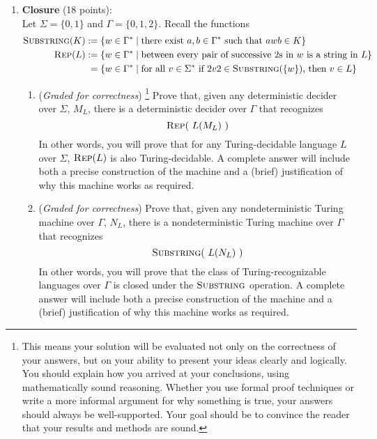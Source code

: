 \documentclass[12pt, oneside]{article}
\newcommand{\gradeCorrect}{({\it Graded for correctness}) }
\newcommand{\gradeCorrectFirst}{\gradeCorrect\footnote{This means your solution 
will be evaluated not only on the correctness of your answers, but on your ability
to present your ideas clearly and logically. You should explain how you 
arrived at your conclusions, using
mathematically sound reasoning. Whether you use formal proof techniques or 
write a more informal argument
for why something is true, your answers should always be well-supported. 
Your goal should be to convince the
reader that your results and methods are sound.} }
\newcommand{\gradeComplete}{({\it Graded for completeness}) }
\newcommand{\SUBSTRING}{\textsc{Substring}}
\newcommand{\REP}{\textsc{Rep}}
\begin{document}
\begin{enumerate}
\begin{enumerate}
\item\gradeComplete Show that it is possible to have the same kind of delimited encoding without 
using special delimiter characters. In particular, prove that for every DFA $M$, 
we can assume that $\langle M \rangle \subseteq \{0,1\}^*$.

\end{enumerate}

\noindent\textit{Challenge; not graded:\newline For the delimited encoding schemes above, 
there are strings over the encoding alphabet 
($\Sigma$) that nevertheless do not correspond to a valid DFA. \newline \newline
Prove/disprove: There exists an encoding scheme for which this is not true; that is, 
\[\{ \langle M \rangle \mid M \text{ is a DFA}\} = \Sigma^*.\]}

\vfill



\item \textbf{Closure} (18 points): \\
Let $\Sigma = \{0,1\}$ and $\Gamma = \{0,1,2\}$. Recall the functions
    \begin{align*}
    \SUBSTRING(K) &:= \{ w \in \Gamma^* \mid \text{there exist } a,b \in \Gamma^* \text{ such that } awb \in K\} \\
    \REP(L) &:= \{ w \in \Gamma^* \mid \text{between every 
    pair of successive $2$s in $w$ is a string in $L$}\}\\
    &\phantom{:}=\{w \in \Gamma^* \mid \text{for all } v \in \Sigma^* \text{ if } 2v2 \in \SUBSTRING(\{w\})  \text{, then } v \in L\}
    \end{align*}
\begin{enumerate}
    \item\gradeCorrectFirst Prove that, given any deterministic decider
    over $\Sigma$, $M_L$, there is a deterministic decider over 
    $\Gamma$ that recognizes $$\REP(~L(M_L)~)$$
    In other words, you 
    will prove that for any Turing-decidable language $L$ over $\Sigma$, 
    $\REP(L)$
    is also Turing-decidable. A complete answer will 
    include both a precise construction of the machine and a 
    (brief) justification of why this machine works as required.
    
    \item\gradeCorrect Prove that, given any nondeterministic Turing machine over 
    $\Gamma$, $N_L$, there is a nondeterministic Turing machine over 
    $\Gamma$ that recognizes $$\SUBSTRING(~L(N_L)~)$$
    In other words, you will prove that the class of Turing-recognizable languages 
    over $\Gamma$ is closed 
    under the $\SUBSTRING$ operation.
     A complete answer will 
    include both a precise construction of the machine and a 
    (brief) justification of why this machine works as required.
    

\end{enumerate}
\end{enumerate}
\end{document}
